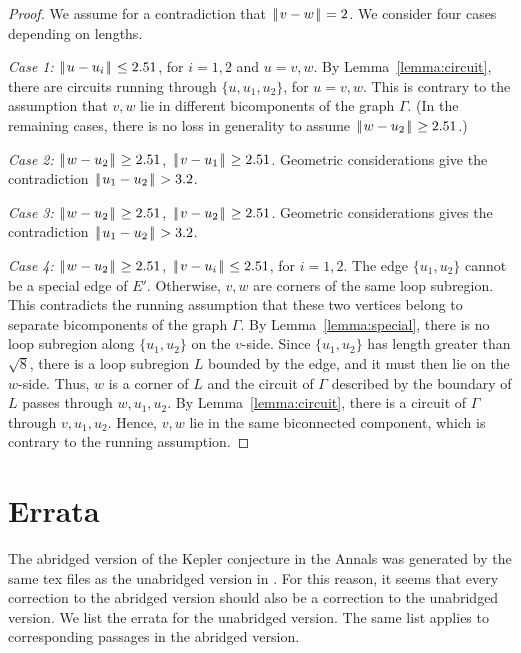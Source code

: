 \documentclass[11pt]{amsart}
\def\|{{\hskip0.1em|\hskip-0.15em|\hskip0.1em}}
\begin{document}
\begin{proof} We assume for a contradiction that $\|v-w\|=2$.
We consider four cases depending on lengths.  

{\it Case 1:} $\|u-u_i\|\le 2.51$, for $i=1,2$ and $u=v,w$.
By Lemma~\ref{lemma:circuit}, there are circuits running through
$\{u,u_1,u_2\}$, for $u=v,w$.  This is contrary to the assumption
that $v,w$ lie in different bicomponents of the graph $\Gamma$.  (In the remaining cases, there is
no loss in generality to assume $\|w-u_2\|\ge 2.51$.)

{\it Case 2:} $\|w-u_2\|\ge 2.51$, $\|v-u_1\|\ge 2.51$.
Geometric considerations give the contradiction
$\|u_1-u_2\|>3.2$.

{\it Case 3:} $\|w-u_2\|\ge 2.51$, $\|v-u_2\|\ge 2.51$.
Geometric considerations gives the contradiction
$\|u_1-u_2\|>3.2$.

{\it Case 4:} $\|w-u_2\|\ge 2.51$, $\|v-u_i\|\le 2.51$, for $i=1,2$.
The edge $\{u_1,u_2\}$ cannot be a special edge of $E'$.  Otherwise,
$v,w$ are corners of the same loop subregion.  This contradicts
the running assumption that these two vertices belong to separate
bicomponents of the graph $\Gamma$.  By Lemma~\ref{lemma:special}, there is no loop subregion along $\{u_1,u_2\}$ on the $v$-side.
Since $\{u_1,u_2\}$ has length greater than $\sqrt8$, there
is a loop subregion $L$ bounded by the edge, and it must then lie
on the $w$-side.  Thus, $w$ is a corner of $L$ and the circuit of
$\Gamma$ described by the boundary of $L$ passes through $w,u_1,u_2$.
By Lemma~\ref{lemma:circuit}, there is a circuit of $\Gamma$ through
$v,u_1,u_2$.  Hence, $v,w$ lie in the same biconnected component,
which is contrary to the running assumption.
\end{proof}



\section{Errata}


The abridged version of the Kepler conjecture
in the Annals \cite{Hales:2005:Annals}
was generated by the same tex
files as the unabridged version in \cite{Hales:2006:DCG}.
For this reason,
it seems that every correction to
the abridged version should also be a correction to the unabridged version.
We list the errata for the
unabridged version. The same list applies to corresponding 
passages in the abridged version.  
\end{document}
